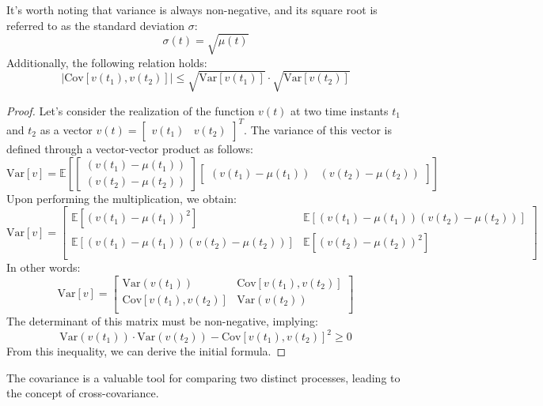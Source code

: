 It's worth noting that variance is always non-negative, and its square root is referred to as the standard deviation $\sigma$:
\[\sigma(t)=\sqrt{\mu(t)}\] 
Additionally, the following relation holds:
\[\left\lvert \text{Cov}\left[v(t_1),v(t_2)\right] \right\rvert \leq \sqrt{\text{Var}\left[ v(t_1) \right]} \cdot \sqrt{\text{Var}\left[ v(t_2) \right]}\]
\begin{proof}
    Let's consider the realization of the function $v(t)$ at two time instants $t_1$ and $t_2$ as a vector  $v(t)=\begin{bmatrix} v(t_1) & v(t_2) \end{bmatrix}^T$. 
    The variance of this vector is defined through a vector-vector product as follows:
    \[\text{Var}\left[v\right]=\mathbb{E}\left[
    \begin{bmatrix}
        \left(v(t_1) - \mu (t_1)\right) \\ \left(v(t_2) - \mu(t_2)\right)
    \end{bmatrix}
    \begin{bmatrix}
        \left(v(t_1) - \mu (t_1)\right) & \left(v(t_2) - \mu(t_2)\right)
    \end{bmatrix} \right]\]
    Upon performing the multiplication, we obtain:
    \[\text{Var}\left[v\right] = 
    \begin{bmatrix}
        \mathbb{E}\left[ \left( v(t_1)-\mu(t_1) \right)^2 \right] & \mathbb{E}\left[ \left( v(t_1)-\mu(t_1) \right)\left( v(t_2)-\mu(t_2) \right) \right] \\
        \mathbb{E}\left[ \left( v(t_1)-\mu(t_1) \right)\left( v(t_2)-\mu(t_2) \right) \right] & \mathbb{E}\left[ \left( v(t_2)-\mu(t_2) \right)^2 \right] \\
    \end{bmatrix}\]
    In other words:
    \[\text{Var}\left[v\right] = 
    \begin{bmatrix}
        \text{Var} \left(v(t_1)\right) & \text{Cov}\left[v(t_1),v(t_2)\right] \\
        \text{Cov}\left[v(t_1),v(t_2)\right] & \text{Var} \left(v(t_2)\right) \\
    \end{bmatrix}\]
    The determinant of this matrix must be non-negative, implying:
    \[\text{Var} \left(v(t_1)\right) \cdot \text{Var} \left(v(t_2)\right) - \text{Cov}\left[v(t_1),v(t_2)\right]^2 \geq 0\]
    From this inequality, we can derive the initial formula.
\end{proof}
The covariance is a valuable tool for comparing two distinct processes, leading to the concept of cross-covariance.


